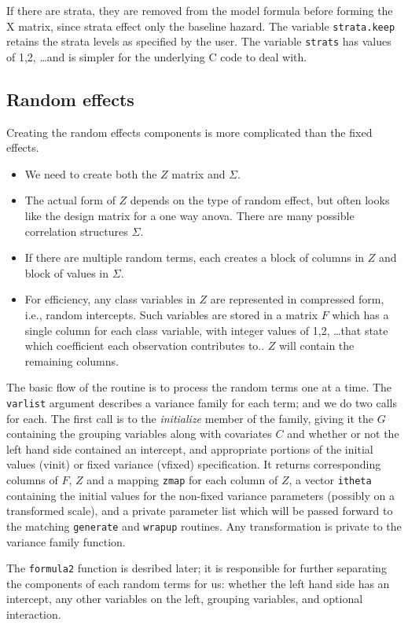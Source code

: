 \documentclass{article}
\begin{document}
If there are strata, they are removed from the model formula
before forming the X matrix, since strata effect only the
baseline hazard.
The variable {\tt{}strata.keep} retains the strata levels as specified by
the user.
The variable {\tt{}strats} has values of 1,2, \ldots and
is simpler for the underlying C code to deal with.

\subsection{Random effects}
Creating the random effects components is more complicated than the 
fixed effects.
\begin{itemize}
  \item We need to create both the $Z$ matrix and $\Sigma$.
  \item The actual form of $Z$ depends on the type of random
    effect, but often looks like the design matrix for a one way anova.
    There are many possible correlation structures $\Sigma$.
  \item If there are multiple random terms, each creates a block of columns
    in $Z$ and block of values in $\Sigma$.
  \item For efficiency, any class variables in $Z$ are
    represented in compressed form, i.e., random intercepts.  
    Such variables are stored in a matrix $F$ which has a single column 
    for each class variable, with integer
    values of 1,2, \ldots that state which coefficient each observation
    contributes to.. $Z$ will contain the remaining
    columns.
\end{itemize}
The basic flow of the routine is to process the random terms one at a time.
The {\tt{}varlist} argument 
describes a variance family for each term; and
we do two calls for each.
The first call is to the \emph{initialize} member of the family, giving it the
$G$ containing the grouping variables along with covariates
$C$ and whether or not the left hand side contained an intercept, and
appropriate portions of the initial values (vinit) or fixed variance
(vfixed) specification.
It returns corresponding columns of $F$, $Z$ and a mapping {\tt{}zmap} for
each column of $Z$,  a vector {\tt{}itheta} containing
the initial values for the non-fixed variance parameters (possibly on
a transformed scale), and a private 
parameter list which will be passed forward to the matching {\tt{}generate}
and {\tt{}wrapup} routines.
Any transformation is private to the variance family function.

The {\tt{}formula2} function is desribed later; it is responsible for 
further separating the components of each random terms for us: 
whether the left hand side has
an intercept, any other variables on the left, grouping variables, and
optional interaction.
\end{document}
